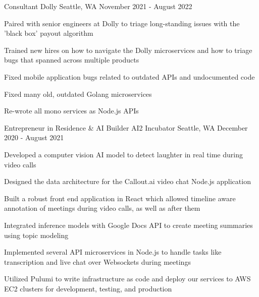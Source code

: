 \begin{cventries}
  \cventry
    {Consultant} %
    {Dolly} %
    {Seattle, WA} %
    {November 2021 - August 2022} %
    {
      \begin{cvitems} %
        \item {Paired with senior engineers at Dolly to triage long-standing issues with the 'black box' payout algorithm}
        \item {Trained new hires on how to navigate the Dolly microservices and how to triage bugs that spanned across multiple products}
        \item {Fixed mobile application bugs related to outdated APIs and undocumented code}
        \item {Fixed many old, outdated Golang microservices}
        \item {Re-wrote all mono services as Node.js APIs}
      \end{cvitems}
    }

  \cventry
    {Entrepreneur in Residence \& AI Builder} %
    {AI2 Incubator} %
    {Seattle, WA} %
    {December 2020 - August 2021} %
    {
      \begin{cvitems} %
        \item {Developed a computer vision AI model to detect laughter in real time during video calls}
        \item {Designed the data architecture for the Callout.ai video chat Node.js application}
        \item {Built a robust front end application in React which allowed timeline aware annotation of meetings during video calls, as well as after them}
        \item {Integrated inference models with Google Docs API to create meeting summaries using topic modeling}
        \item {Implemented several API microservices in Node.js to handle tasks like transcription and live chat over Websockets during meetings}
        \item {Utilized Pulumi to write infrastructure as code and deploy our services to AWS EC2 clusters for development, testing, and production}
      \end{cvitems}
    }


\end{cventries}
